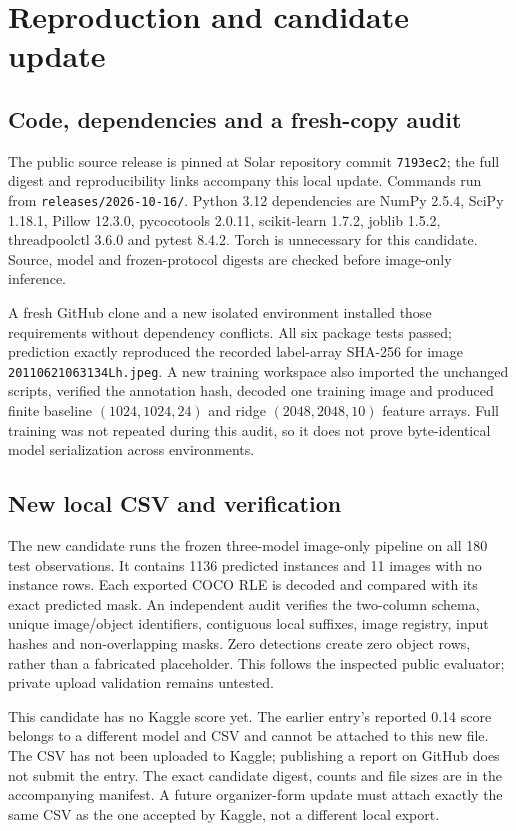 \documentclass[sigconf]{acmart}
\begin{document}
\section{Reproduction and candidate update}
\subsection{Code, dependencies and a fresh-copy audit}
The public source release is pinned at Solar repository commit \texttt{7193ec2}; the full digest and reproducibility links accompany this local update. Commands run from \texttt{releases/2026-10-16/}. Python 3.12 dependencies are NumPy 2.5.4, SciPy 1.18.1, Pillow 12.3.0, pycocotools 2.0.11, scikit-learn 1.7.2, joblib 1.5.2, threadpoolctl 3.6.0 and pytest 8.4.2. Torch is unnecessary for this candidate. Source, model and frozen-protocol digests are checked before image-only inference.

A fresh GitHub clone and a new isolated environment installed those requirements without dependency conflicts. All six package tests passed; prediction exactly reproduced the recorded label-array SHA-256 for image \texttt{20110621063134Lh.jpeg}. A new training workspace also imported the unchanged scripts, verified the annotation hash, decoded one training image and produced finite baseline $(1024,1024,24)$ and ridge $(2048,2048,10)$ feature arrays. Full training was not repeated during this audit, so it does not prove byte-identical model serialization across environments.

\subsection{New local CSV and verification}
The new candidate runs the frozen three-model image-only pipeline on all 180 test observations. It contains 1136 predicted instances and 11 images with no instance rows. Each exported COCO RLE is decoded and compared with its exact predicted mask. An independent audit verifies the two-column schema, unique image/object identifiers, contiguous local suffixes, image registry, input hashes and non-overlapping masks. Zero detections create zero object rows, rather than a fabricated placeholder. This follows the inspected public evaluator; private upload validation remains untested.

This candidate has no Kaggle score yet. The earlier entry's reported 0.14 score belongs to a different model and CSV and cannot be attached to this new file. The CSV has not been uploaded to Kaggle; publishing a report on GitHub does not submit the entry. The exact candidate digest, counts and file sizes are in the accompanying manifest. A future organizer-form update must attach exactly the same CSV as the one accepted by Kaggle, not a different local export.
\end{document}
